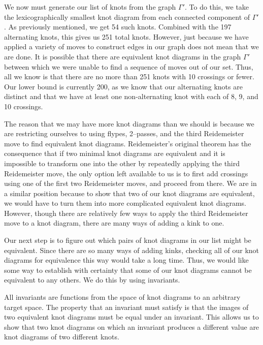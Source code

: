 \begin{paper}
We now must generate our list of knots from the graph $\Gamma'$.
To do this, we take the lexicographically smallest knot diagram from each
connected component of $\Gamma'$.
As previously mentioned, we get 54 such knots.
Combined with the 197 alternating knots, this gives us 251 total knots.
However, just because we have applied a variety of moves to construct edges in
our graph does not mean that we are done.
It is possible that there are equivalent knot diagrams in the graph $\Gamma'$
between which we were unable to find a sequence of moves out of our set.
Thus, all we know is that there are no more than 251 knots with 10 crossings or
fewer.
Our lower bound is currently 200, as we know that our alternating knots are
distinct and that we have at least one non-alternating knot with each of 8, 9,
and 10 crossings.

The reason that we may have more knot diagrams than we should is because we are
restricting ourselves to using flypes, 2--passes, and the third Reidemeister
move to find equivalent knot diagrams.
Reidemeister's original theorem has the consequence that if two minimal knot
diagrams are equivalent and it is impossible to transform one into the other by
repeatedly applying the third Reidemeister move, the only option left available
to us is to first add crossings using one of the first two Reidemeister moves,
and proceed from there.
We are in a similar position because to show that two of our knot diagrams are
equivalent, we would have to turn them into more complicated equivalent knot
diagrams.
However, though there are relatively few ways to apply the third Reidemeister
move to a knot diagram, there are many ways of adding a kink to one.

Our next step is to figure out which pairs of knot diagrams in our list might be
equivalent.
Since there are so many ways of adding kinks, checking all of our knot diagrams
for equivalence this way would take a long time.
Thus, we would like some way to establish with certainty that some of our knot
diagrams cannot be equivalent to any others.
We do this by using invariants.


All invariants are functions from the space of knot diagrams to an arbitrary
target space.
The property that an invariant must satisfy is that the images of two equivalent
knot diagrams must be equal under an invariant.
This allows us to show that two knot diagrams on which an invariant produces a
different value are knot diagrams of two different knots.


\end{paper}
